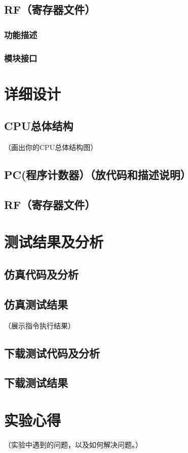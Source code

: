 \documentclass[forprint]{cpu}
\begin{document}
\section{RF（寄存器文件）}
\subsection{功能描述}
\subsection{模块接口}


\chapter{详细设计}
\section{CPU总体结构}
    （画出你的CPU总体结构图）
\section{PC(程序计数器）（放代码和描述说明）}

\section{RF（寄存器文件）}

\chapter{测试结果及分析}
\section{仿真代码及分析}
\section{仿真测试结果}
（展示指令执行结果）
\section{下载测试代码及分析}
\section{下载测试结果}

\chapter{实验心得}
（实验中遇到的问题，以及如何解决问题。）
\end{document}
